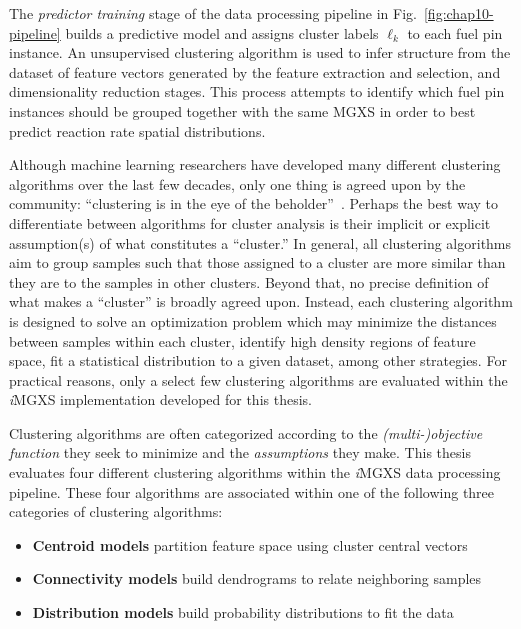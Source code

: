 The \textit{predictor training} stage of the data processing pipeline in Fig.~\ref{fig:chap10-pipeline} builds a predictive model and assigns cluster labels $\ell_{k}$ to each fuel pin instance. An unsupervised clustering algorithm is used to infer structure from the dataset of feature vectors generated by the feature extraction and selection, and dimensionality reduction stages. This process attempts to identify which fuel pin instances should be grouped together with the same \ac{MGXS} in order to best predict reaction rate spatial distributions.


Although machine learning researchers have developed many different clustering algorithms over the last few decades, only one thing is agreed upon by the community: ``clustering is in the eye of the beholder''~\cite{castro2002clustering}. Perhaps the best way to differentiate between algorithms for cluster analysis is their implicit or explicit assumption(s) of what constitutes a ``cluster.'' In general, all clustering algorithms aim to group samples such that those assigned to a cluster are more similar than they are to the samples in other clusters. Beyond that, no precise definition of what makes a ``cluster'' is broadly agreed upon. Instead, each clustering algorithm is designed to solve an optimization problem which may minimize the distances between samples within each cluster, identify high density regions of feature space, fit a statistical distribution to a given dataset, among other strategies. For practical reasons, only a select few clustering algorithms are evaluated within the \textit{i}\ac{MGXS} implementation developed for this thesis.

Clustering algorithms are often categorized according to the \textit{(multi-)objective function} they seek to minimize and the \textit{assumptions} they make. This thesis evaluates four different clustering algorithms within the \textit{i}\ac{MGXS} data processing pipeline. These four algorithms are associated within one of the following three categories of clustering algorithms:
 
\begin{itemize}[noitemsep]
\item \textbf{Centroid models} partition feature space using cluster central vectors
\item \textbf{Connectivity models} build dendrograms to relate neighboring samples
\item \textbf{Distribution models} build probability distributions to fit the data
\end{itemize}

